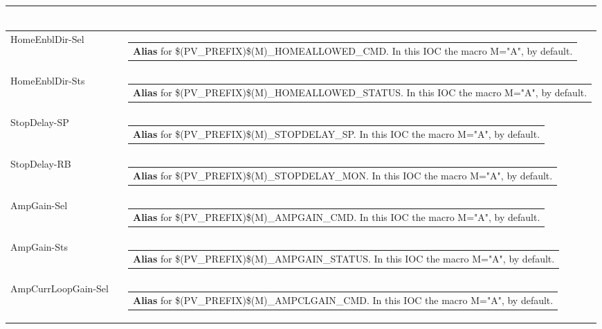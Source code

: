 \documentclass[openany]{article}
\begin{document}
\begin{longtable}{| m{4.5cm} m{2.5cm}  m{8.5cm} |}
\begin{tabular}{@{}m{6cm}@{}}
            \end{tabular} \hypertarget{pv:home-enbl-dir}{}\\ \hline
        HomeEnblDir-Sel &  & \begin{tabular}{@{}m{6cm}@{}}
                \textbf{\color{blue} Alias} for \$(PV\_PREFIX)\$(M)\_HOMEALLOWED\_CMD. In this IOC the macro M="A", by default.
            \end{tabular} \hypertarget{}{}\\ \hline
        HomeEnblDir-Sts &  & \begin{tabular}{@{}m{6cm}@{}}
                \textbf{\color{blue} Alias} for \$(PV\_PREFIX)\$(M)\_HOMEALLOWED\_STATUS. In this IOC the macro M="A", by default.
            \end{tabular} \hypertarget{pv:stop-delay}{}\\ \hline
        StopDelay-SP &  & \begin{tabular}{@{}m{6cm}@{}}
                \textbf{\color{blue} Alias} for \$(PV\_PREFIX)\$(M)\_STOPDELAY\_SP. In this IOC the macro M="A", by default.
            \end{tabular} \hypertarget{}{}\\ \hline
        StopDelay-RB &  & \begin{tabular}{@{}m{6cm}@{}}
                \textbf{\color{blue} Alias} for \$(PV\_PREFIX)\$(M)\_STOPDELAY\_MON. In this IOC the macro M="A", by default.
            \end{tabular} \hypertarget{pv:amp-gain}{}\\ \hline
        AmpGain-Sel &  & \begin{tabular}{@{}m{6cm}@{}}
                \textbf{\color{blue} Alias} for \$(PV\_PREFIX)\$(M)\_AMPGAIN\_CMD. In this IOC the macro M="A", by default.
            \end{tabular} \hypertarget{}{}\\ \hline
        AmpGain-Sts &  & \begin{tabular}{@{}m{6cm}@{}}
                \textbf{\color{blue} Alias} for \$(PV\_PREFIX)\$(M)\_AMPGAIN\_STATUS. In this IOC the macro M="A", by default.
            \end{tabular} \hypertarget{pv:amp-curr-loop-gain}{}\\ \hline
        AmpCurrLoopGain-Sel &  & \begin{tabular}{@{}m{6cm}@{}}
                \textbf{\color{blue} Alias} for \$(PV\_PREFIX)\$(M)\_AMPCLGAIN\_CMD. In this IOC the macro M="A", by default.

\end{tabular}
\end{longtable}
\end{document}
